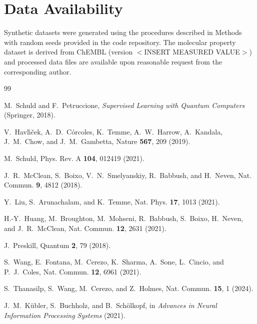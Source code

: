 \documentclass[aps,prb,reprint,superscriptaddress,showpacs]{revtex4-2}
\begin{document}
\section*{Data Availability}

Synthetic datasets were generated using the procedures described in Methods with random seeds provided in the code repository. The molecular property dataset is derived from ChEMBL (version $<$INSERT MEASURED VALUE$>$) and processed data files are available upon reasonable request from the corresponding author.


\begin{thebibliography}{99}

M.~Schuld and F.~Petruccione, \emph{Supervised Learning with Quantum Computers} (Springer, 2018).

V.~Havl{\'\i}{\v{c}}ek, A.~D.~C{\'o}rcoles, K.~Temme, A.~W.~Harrow, A.~Kandala, J.~M.~Chow, and J.~M.~Gambetta, Nature \textbf{567}, 209 (2019).

M.~Schuld, Phys. Rev. A \textbf{104}, 012419 (2021).

J.~R.~McClean, S.~Boixo, V.~N.~Smelyanskiy, R.~Babbush, and H.~Neven, Nat. Commun. \textbf{9}, 4812 (2018).

Y.~Liu, S.~Arunachalam, and K.~Temme, Nat. Phys. \textbf{17}, 1013 (2021).

H.-Y.~Huang, M.~Broughton, M.~Mohseni, R.~Babbush, S.~Boixo, H.~Neven, and J.~R.~McClean, Nat. Commun. \textbf{12}, 2631 (2021).

J.~Preskill, Quantum \textbf{2}, 79 (2018).

S.~Wang, E.~Fontana, M.~Cerezo, K.~Sharma, A.~Sone, L.~Cincio, and P.~J.~Coles, Nat. Commun. \textbf{12}, 6961 (2021).

S.~Thanasilp, S.~Wang, M.~Cerezo, and Z.~Holmes, Nat. Commun. \textbf{15}, 1 (2024).

J.~M.~K{\"u}bler, S.~Buchholz, and B.~Sch{\"o}lkopf, in \emph{Advances in Neural Information Processing Systems} (2021).


\end{thebibliography}
\end{document}
